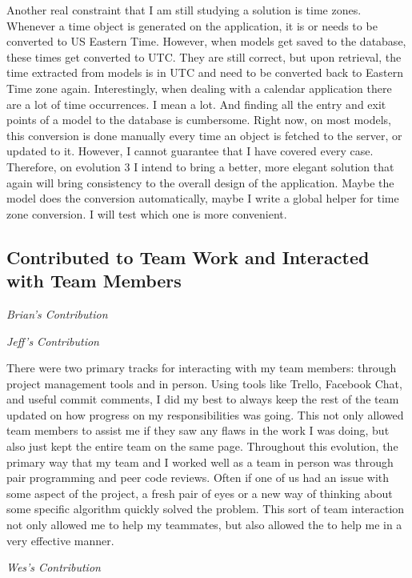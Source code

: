 \documentclass[11pt]{article}
\begin{document}
Another real constraint that I am still studying a solution is time zones. Whenever a time object is generated on the application, it is or needs to be converted to US Eastern Time. However, when models get saved to the database, these times get converted to UTC. They are still correct, but upon retrieval, the time extracted from models is in UTC and need to be converted back to Eastern Time zone again. Interestingly, when dealing with a calendar application there are a lot of time occurrences. I mean a lot. And finding all the entry and exit points of a model to the database is cumbersome. Right now, on most models, this conversion is done manually every time an object is fetched to the server, or updated to it. However, I cannot guarantee that I have covered every case. Therefore, on evolution 3 I intend to bring a better, more elegant solution that again will bring consistency to the overall design of the application. Maybe the model does the conversion automatically, maybe I write a global helper for time zone conversion. I will test which one is more convenient.

\subsection{Contributed to Team Work and Interacted with Team Members}

\textit{Brian's Contribution}



\textit{Jeff's Contribution}

There were two primary tracks for interacting with my team members: through project management tools and in person.  Using tools like Trello, Facebook Chat, and useful commit comments, I did my best to always keep the rest of the team updated on how progress on my responsibilities was going.  This not only allowed team members to assist me if they saw any flaws in the work I was doing, but also just kept the entire team on the same page.  Throughout this evolution, the primary way that my team and I worked well as a team in person was through pair programming and peer code reviews.  Often if one of us had an issue with some aspect of the project, a fresh pair of eyes or a new way of thinking about some specific algorithm quickly solved the problem.  This sort of team interaction not only allowed me to help my teammates, but also allowed the to help me in a very effective manner.

\textit{Wes's Contribution}
\end{document}
